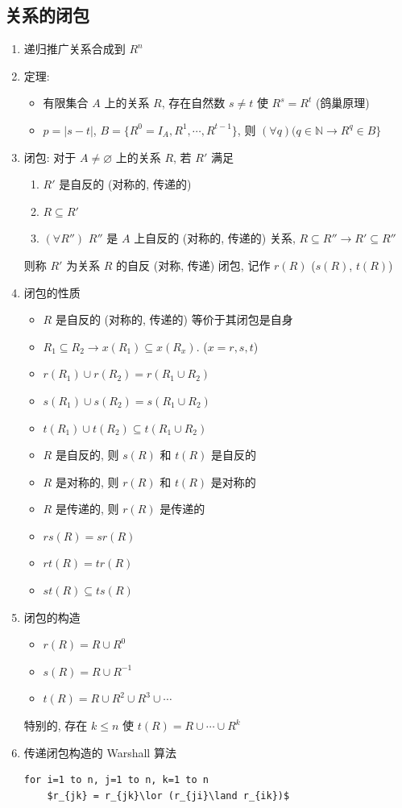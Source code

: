 \documentclass[11pt,a4paper,twocolumn,fleqn]{article} %
\renewcommand{\emptyset}{\varnothing}
\begin{document}
\subsection{关系的闭包} %
\label{sub:closure}
\begin{enumerate}
	\item 递归推广关系合成到 $R^n$
	\item 定理: 
	\begin{itemize}
		\item 有限集合 $A$ 上的关系 $R$, 存在自然数 $s \neq t$ 使 $R^s = R^t$ 
		(鸽巢原理)
		\item $p = |s-t|$, $B = \{R^0 = I_A, R^1, \cdots, R^{t-1}\}$, 则
		$(\forall q)(q\in\mathbb N \to R^q\in B\}$
	\end{itemize}
	\item 闭包: 对于 $A\neq\emptyset$ 上的关系 $R$, 若 $R'$ 满足
	\begin{enumerate}
		\item $R'$ 是自反的 (对称的, 传递的)
		\item $R\subseteq R'$
		\item $(\forall R'')$ $R''$ 是 $A$ 上自反的 (对称的, 传递的) 关系, 
		$R\subseteq R'' \to R'\subseteq R''$
	\end{enumerate}
	则称 $R'$ 为关系 $R$ 的自反 (对称, 传递) 闭包, 记作 $r(R)$ ($s(R)$, $t(R)$)
	\item 闭包的性质
	\begin{itemize}
		\item $R$ 是自反的 (对称的, 传递的) 等价于其闭包是自身
		\item $R_1 \subseteq R_2 \rightarrow x(R_1)\subseteq x(R_x)$. 
		($x = r,s,t$)
		\item $r(R_1)\cup r(R_2) = r(R_1\cup R_2)$
		\item $s(R_1)\cup s(R_2) = s(R_1\cup R_2)$
		\item $t(R_1)\cup t(R_2) \subseteq t(R_1\cup R_2)$
		\item $R$ 是自反的, 则 $s(R)$ 和 $t(R)$ 是自反的
		\item $R$ 是对称的, 则 $r(R)$ 和 $t(R)$ 是对称的
		\item $R$ 是传递的, 则 $r(R)$ 是传递的
		\item $rs(R) = sr(R)$
		\item $rt(R) = tr(R)$
		\item $st(R)\subseteq ts(R)$
	\end{itemize}
	\item 闭包的构造
	\begin{itemize}
		\item $r(R) = R\cup R^0$
		\item $s(R) = R\cup R^{-1}$
		\item $t(R) = R\cup R^2\cup R^3\cup\cdots$
	\end{itemize}
	特别的, 存在 $k\le n$ 使 $t(R) =  R\cup\cdots\cup R^k$
	\item 传递闭包构造的 Warshall 算法
	\begin{lstlisting}[mathescape, caption=Warshall 算法]
for i=1 to n, j=1 to n, k=1 to n
	$r_{jk} = r_{jk}\lor (r_{ji}\land r_{ik})$
	\end{lstlisting}
\end{enumerate}
\end{document}
